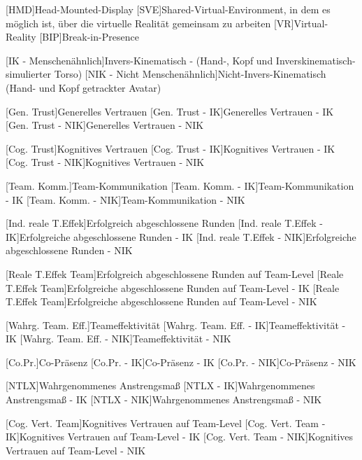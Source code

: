 \begin{acronym}
	[HMD]{Head-Mounted-Display}
	[SVE]{Shared-Virtual-Environment, in dem es möglich ist, über die virtuelle Realität gemeinsam zu arbeiten}
	[VR]{Virtual-Reality}
	[BIP]{Break-in-Presence}
	
	[IK - Menschenähnlich]{Invers-Kinematisch - (Hand-, Kopf und Inverskinematisch-simulierter Torso)}
	[NIK - Nicht Menschenähnlich]{Nicht-Invers-Kinematisch (Hand- und Kopf getrackter Avatar)}
	
	[Gen. Trust]{Generelles Vertrauen}
	[Gen. Trust - IK]{Generelles Vertrauen - IK}
	[Gen. Trust - NIK]{Generelles Vertrauen - NIK}
	
	[Cog. Trust]{Kognitives Vertrauen}
	[Cog. Trust - IK]{Kognitives Vertrauen - IK}
	[Cog. Trust - NIK]{Kognitives Vertrauen - NIK}
	
	[Team. Komm.]{Team-Kommunikation}
	[Team. Komm. - IK]{Team-Kommunikation - IK}
	[Team. Komm. - NIK]{Team-Kommunikation - NIK}
	
	[Ind. reale T.Effek]{Erfolgreich abgeschlossene Runden}
	[Ind. reale T.Effek - IK]{Erfolgreiche abgeschlossene Runden - IK}
	[Ind. reale T.Effek - NIK]{Erfolgreiche abgeschlossene Runden - NIK}	
	
	[Reale T.Effek Team]{Erfolgreich abgeschlossene Runden auf Team-Level}
	[Reale T.Effek Team]{Erfolgreiche abgeschlossene Runden auf Team-Level - IK}
	[Reale T.Effek Team]{Erfolgreiche abgeschlossene Runden auf Team-Level - NIK}
	
	[Wahrg. Team. Eff.]{Teameffektivität}
	[Wahrg. Team. Eff. - IK]{Teameffektivität - IK}
	[Wahrg. Team. Eff. - NIK]{Teameffektivität - NIK}
	
	[Co.Pr.]{Co-Präsenz}
	[Co.Pr. - IK]{Co-Präsenz - IK}
	[Co.Pr. - NIK]{Co-Präsenz - NIK}
	
	[NTLX]{Wahrgenommenes Anstrengsmaß}
	[NTLX - IK]{Wahrgenommenes Anstrengsmaß - IK}
	[NTLX - NIK]{Wahrgenommenes Anstrengsmaß - NIK}
	
	[Cog. Vert. Team]{Kognitives Vertrauen auf Team-Level}
	[Cog. Vert. Team - IK]{Kognitives Vertrauen auf Team-Level - IK}
	[Cog. Vert. Team - NIK]{Kognitives Vertrauen auf Team-Level - NIK}
	

\end{acronym}
